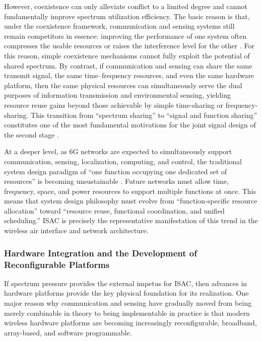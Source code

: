 However, coexistence can only alleviate conflict to a limited degree and cannot fundamentally improve spectrum utilization efficiency. The basic reason is that, under the coexistence framework, communication and sensing systems still remain competitors in essence: improving the performance of one system often compresses the usable resources or raises the interference level for the other \cite{Liu2020JointRadarComm,Chiriyath2017RadarCommCoexistence}. For this reason, simple coexistence mechanisms cannot fully exploit the potential of shared spectrum. By contrast, if communication and sensing can share the same transmit signal, the same time--frequency resources, and even the same hardware platform, then the same physical resources can simultaneously serve the dual purposes of information transmission and environmental sensing, yielding resource reuse gains beyond those achievable by simple time-sharing or frequency-sharing. This transition from ``spectrum sharing'' to ``signal and function sharing'' constitutes one of the most fundamental motivations for the joint signal design of the second stage \cite{Liu2022ISAC,Hassanien2015dual}.

At a deeper level, as 6G networks are expected to simultaneously support communication, sensing, localization, computing, and control, the traditional system design paradigm of ``one function occupying one dedicated set of resources'' is becoming unsustainable \cite{Gonzalez2024integrated,Saad2020Vision6G}. Future networks must allow time, frequency, space, and power resources to support multiple functions at once. This means that system design philosophy must evolve from ``function-specific resource allocation'' toward ``resource reuse, functional coordination, and unified scheduling.'' ISAC is precisely the representative manifestation of this trend in the wireless air interface and network architecture.

\subsubsection{Hardware Integration and the Development of Reconfigurable Platforms}
\label{subsubsec:ch1-driving-force-hardware}

If spectrum pressure provides the external impetus for ISAC, then advances in hardware platforms provide the key physical foundation for its realization. One major reason why communication and sensing have gradually moved from being merely combinable in theory to being implementable in practice is that modern wireless hardware platforms are becoming increasingly reconfigurable, broadband, array-based, and software programmable.

